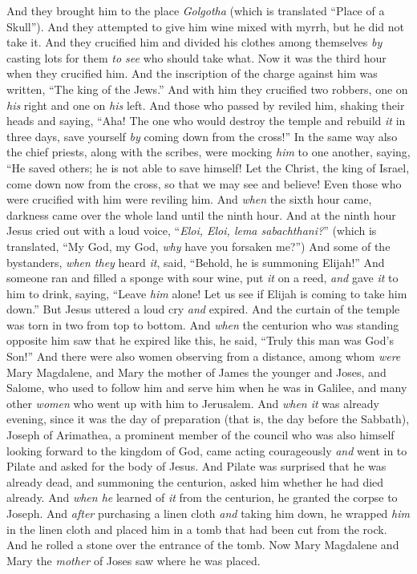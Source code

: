 \begin{biblechapter}
\verse And they brought him to the place \textit{Golgotha} (which is translated “Place of a Skull”).
\verse And they attempted to give him wine mixed with myrrh, but he did not take it.
\verse And they crucified him and divided his clothes among themselves \textit{by} casting lots for them \textit{to see} who should take what.
\verse Now it was the third hour when they crucified him.
\verse And the inscription of the charge against him was written, “The king of the Jews.”
\verse And with him they crucified two robbers, one on \textit{his} right and one on \textit{his} left.
\verse And those who passed by reviled him, shaking their heads and saying, “Aha! The one who would destroy the temple and rebuild \textit{it} in three days,
\verse save yourself \textit{by} coming down from the cross!”
\verse In the same way also the chief priests, along with the scribes, were mocking \textit{him} to one another, saying, “He saved others; he is not able to save himself!
\verse Let the Christ, the king of Israel, come down now from the cross, so that we may see and believe! Even those who were crucified with him were reviling him.
 And \textit{when} the sixth hour came, darkness came over the whole land until the ninth hour.
\verse And at the ninth hour Jesus cried out with a loud voice, “\textit{Eloi, Eloi, lema sabachthani?}” (which is translated, “My God, my God, \textit{why} have you forsaken me?”)
\verse And some of the bystanders, \textit{when they} heard \textit{it}, said, “Behold, he is summoning Elijah!”
\verse And someone ran and filled a sponge with sour wine, put \textit{it} on a reed, \textit{and} gave \textit{it} to him to drink, saying, “Leave \textit{him} alone! Let us see if Elijah is coming to take him down.”
\verse But Jesus uttered a loud cry \textit{and} expired.
\verse And the curtain of the temple was torn in two from top to bottom.
\verse And \textit{when} the centurion who was standing opposite him saw that he expired like this, he said, “Truly this man was God’s Son!”
\verse And there were also women observing from a distance, among whom \textit{were} Mary Magdalene, and Mary the mother of James the younger and Joses, and Salome,
\verse who used to follow him and serve him when he was in Galilee, and many other \textit{women} who went up with him to Jerusalem.
 And \textit{when it} was already evening, since it was the day of preparation (that is, the day before the Sabbath),
\verse Joseph of Arimathea, a prominent member of the council who was also himself looking forward to the kingdom of God, came acting courageously \textit{and} went in to Pilate and asked for the body of Jesus.
\verse And Pilate was surprised that he was already dead, and summoning the centurion, asked him whether he had died already.
\verse And \textit{when he} learned of \textit{it} from the centurion, he granted the corpse to Joseph.
\verse And \textit{after} purchasing a linen cloth \textit{and} taking him down, he wrapped \textit{him} in the linen cloth and placed him in a tomb that had been cut from the rock. And he rolled a stone over the entrance of the tomb.
\verse Now Mary Magdalene and Mary the \textit{mother} of Joses saw where he was placed.
\end{biblechapter}

